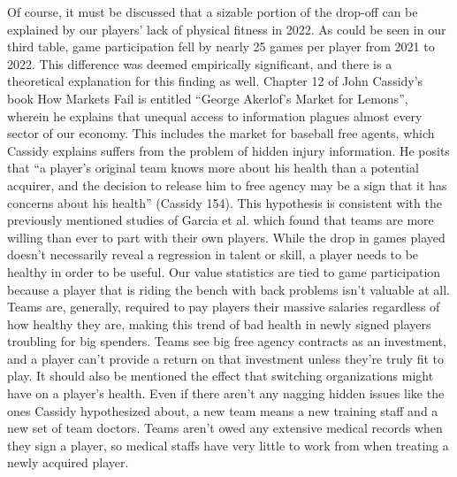 \documentclass[10pt]{article}
\begin{document}
Of course, it must be discussed that a sizable portion of the drop-off can be explained by our players’ lack of physical 
fitness in 2022. As could be seen in our third table, game participation fell by nearly 25 games per player from 2021 to 2022. 
This difference was deemed empirically significant, and there is a theoretical explanation for this finding as well. Chapter 
12 of John Cassidy’s book How Markets Fail is entitled “George Akerlof’s Market for Lemons”, wherein he explains that unequal 
access to information plagues almost every sector of our economy. This includes the market for baseball free agents, which 
Cassidy explains suffers from the problem of hidden injury information. He posits that “a player’s original team knows more 
about his health than a potential acquirer, and the decision to release him to free agency may be a sign that it has concerns 
about his health” (Cassidy 154). This hypothesis is consistent with the previously mentioned studies of Garcia et al. which 
found that teams are more willing than ever to part with their own players. While the drop in games played doesn’t necessarily 
reveal a regression in talent or skill, a player needs to be healthy in order to be useful. Our value statistics are tied to 
game participation because a player that is riding the bench with back problems isn’t valuable at all. Teams are, generally, 
required to pay players their massive salaries regardless of how healthy they are, making this trend of bad health in newly 
signed players troubling for big spenders. Teams see big free agency contracts as an investment, and a player can’t provide a 
return on that investment unless they’re truly fit to play. It should also be mentioned the effect that switching organizations 
might have on a player’s health. Even if there aren’t any nagging hidden issues like the ones Cassidy hypothesized about, a 
new team means a new training staff and a new set of team doctors. Teams aren’t owed any extensive medical records when they 
sign a player, so medical staffs have very little to work from when treating a newly acquired player.
\end{document}

